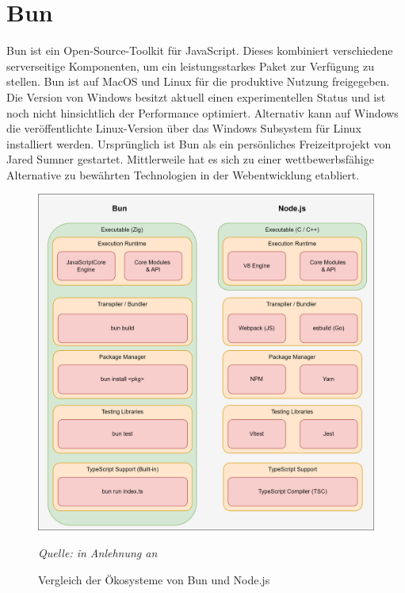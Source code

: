 \section{Bun} \label{sec:foundations-Bun}
Bun ist ein Open-Source-Toolkit für JavaScript. Dieses kombiniert verschiedene serverseitige Komponenten, um ein leistungsstarkes Paket zur Verfügung zu stellen. Bun ist auf MacOS und Linux für die produktive Nutzung freigegeben. Die Version von Windows besitzt aktuell einen experimentellen Status und ist noch nicht hinsichtlich der Performance optimiert. Alternativ kann auf Windows die veröffentlichte Linux-Version über das Windows Subsystem für Linux installiert werden. Ursprünglich ist Bun als ein persönliches Freizeitprojekt von Jared Sumner gestartet. Mittlerweile hat es sich zu einer wettbewerbsfähige Alternative zu bewährten Technologien in der Webentwicklung etabliert.\cite{Sumner.2023c, Tyson.2023}\\

\begin{figure}[!htb]
	\centering
	\includegraphics[width=\linewidth]{./images/EcosystemBunvsNode.png}
	\caption{Vergleich der Ökosysteme von Bun und Node.js}
	\label{fig:ecosystemComparison}
	\textit{Quelle: in Anlehnung an \cite{Springer.2022, OvenSh.2023c}}
\end{figure}

